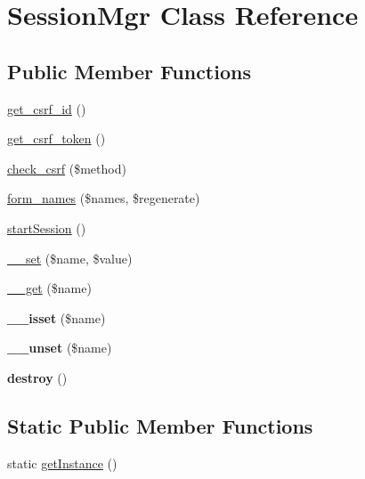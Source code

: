 \hypertarget{classSessionMgr}{\section{Session\-Mgr Class Reference}
\label{classSessionMgr}
}
\subsection*{Public Member Functions}
\begin{DoxyCompactItemize}
\item 
\hyperlink{classSessionMgr_aedbc4cb2228951b67f6176c95a9c177a}{get\-\_\-csrf\-\_\-id} ()
\item 
\hyperlink{classSessionMgr_a6fc75c805601b86bf75e32e74a5dec16}{get\-\_\-csrf\-\_\-token} ()
\item 
\hyperlink{classSessionMgr_ac1a7c2c9873c8f7b64aef607ab96bc78}{check\-\_\-csrf} (\$method)
\item 
\hyperlink{classSessionMgr_aafc03db5cc80b14a459c81a99865b91b}{form\-\_\-names} (\$names, \$regenerate)
\item 
\hyperlink{classSessionMgr_a54067567a91677f592751bcc3096b175}{start\-Session} ()
\item 
\hyperlink{classSessionMgr_a65a1ebe7f9d219bdb88efa18df697295}{\-\_\-\-\_\-set} (\$name, \$value)
\item 
\hyperlink{classSessionMgr_a0c2ca3fa3663059b2490c80897f8d437}{\-\_\-\-\_\-get} (\$name)
\item 
\hypertarget{classSessionMgr_a992329fbe672857d8fd74ebee57329bc}{{\bfseries \-\_\-\-\_\-isset} (\$name)}\label{classSessionMgr_a992329fbe672857d8fd74ebee57329bc}

\item 
\hypertarget{classSessionMgr_ac3cec7da4442db2d333f1ca0a693e1e0}{{\bfseries \-\_\-\-\_\-unset} (\$name)}\label{classSessionMgr_ac3cec7da4442db2d333f1ca0a693e1e0}

\item 
\hypertarget{classSessionMgr_a5eecf3a633697c6dbcd6052575629423}{{\bfseries destroy} ()}\label{classSessionMgr_a5eecf3a633697c6dbcd6052575629423}

\end{DoxyCompactItemize}
\subsection*{Static Public Member Functions}
\begin{DoxyCompactItemize}
\item 
static \hyperlink{classSessionMgr_a089318cf1224b6c02cc755aee63a1d9c}{get\-Instance} ()
\end{DoxyCompactItemize}

